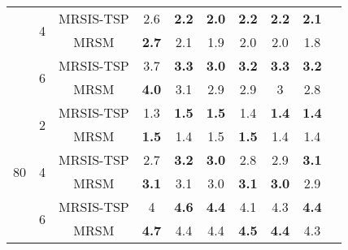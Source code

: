 \begin{table}[h]
{\begin{tabular}{cccccccccc}
  \cmidrule(lr){2-9}
   & \multirow{2}{*}{4} & MRSIS-TSP & 2.6 & \textbf{2.2} & \textbf{2.0} & \textbf{2.2} & \textbf{2.2} & \textbf{2.1} \\
   &  & MRSM & \textbf{2.7} & 2.1 & 1.9 & 2.0 & 2.0 & 1.8 \\
  \cmidrule(lr){2-9}
   & \multirow{2}{*}{6} & MRSIS-TSP & 3.7 & \textbf{3.3} & \textbf{3.0} & \textbf{3.2} & \textbf{3.3} & \textbf{3.2} \\
   &  & MRSM & \textbf{4.0} & 3.1 & 2.9 & 2.9 & 3 & 2.8 \\
  \midrule
  \multirow{6}{*}{80} & \multirow{2}{*}{2} & MRSIS-TSP & 1.3 & \textbf{1.5} & \textbf{1.5} & 1.4 & \textbf{1.4} & \textbf{1.4} \\
   &  & MRSM & \textbf{1.5} & 1.4 & 1.5 & \textbf{1.5} & 1.4 & 1.4 \\
  \cmidrule(lr){2-9}
   & \multirow{2}{*}{4} & MRSIS-TSP & 2.7 & \textbf{3.2} & \textbf{3.0} & 2.8 & 2.9 & \textbf{3.1} \\
   &  & MRSM & \textbf{3.1} & 3.1 & 3.0 & \textbf{3.1} & \textbf{3.0} & 2.9 \\
  \cmidrule(lr){2-9}
   & \multirow{2}{*}{6} & MRSIS-TSP & 4 & \textbf{4.6} & \textbf{4.4} & 4.1 & 4.3 & \textbf{4.4} \\
   &  & MRSM & \textbf{4.7} & 4.4 & 4.4 & \textbf{4.5} & \textbf{4.4} & 4.3 \\
  \bottomrule
  \end{tabular} }
  \end{table}


